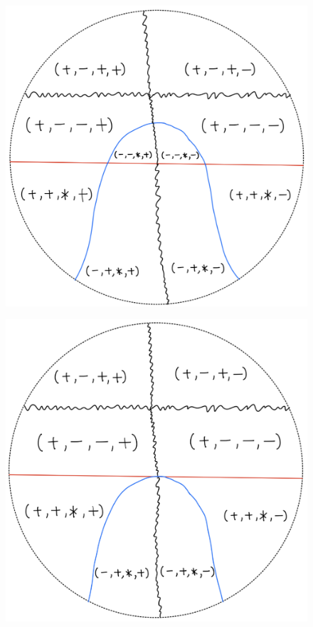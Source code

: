 \begin{definition}
\begin{enumerate}
\begin{itemize}
\begin{figure}[H]
    \caption{}
    \label{fig:your-label}
\end{figure}
\begin{figure}[H]
    \centering
    \includegraphics[scale = 0.45]{diagrams/cobord'2/9.png} 
    \caption{}
    \label{fig:your-label}
\end{figure}
\begin{figure}[H]
    \centering
    \includegraphics[scale = 0.45]{diagrams/cobord'2/10.png} 

\end{figure}
\end{itemize}
\end{enumerate}
\end{definition}
